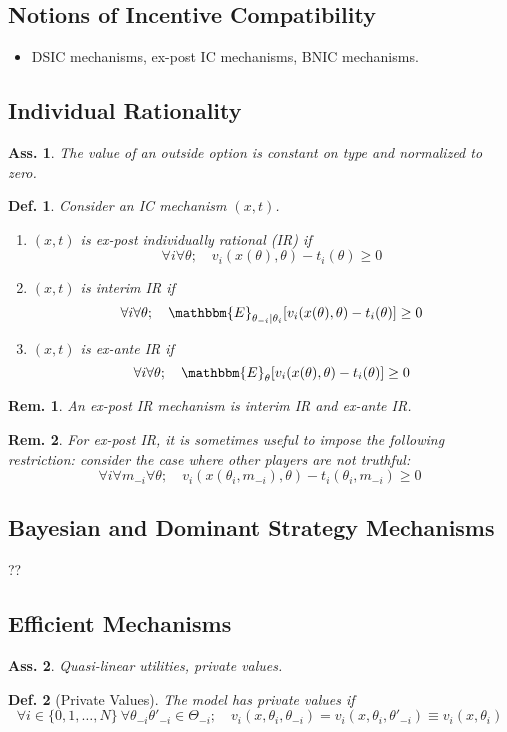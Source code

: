 \documentclass[11pt,a4paper,dvipdfmx]{article}
\theoremstyle{plain}
\newtheorem{df}{Def.}[section]
\newtheorem{rem}{Rem.}[section]
\newtheorem{ass}{Ass.}
\newcommand{\E}{\mathbbm{E}}
\newcommand{\1}{\mathbbm{1}}
\begin{document}
\subsection{Notions of Incentive Compatibility}
\begin{itemize}
	\item DSIC mechanisms, ex-post IC mechanisms, BNIC mechanisms.
\end{itemize}

\subsection{Individual Rationality}
\begin{ass}
	The value of an outside option is constant on type and normalized to zero.
\end{ass}
\begin{df} Consider an IC mechanism $(x,t)$.
	\begin{enumerate}
		\item $(x,t)$ is ex-post individually rational (IR) if
		\[
		\forall i \forall \theta; \quad
		v_i(x(\theta), \theta) - t_i(\theta) \geq 0
		\]
		\item $(x,t)$ is interim IR if
		\[
		\forall i \forall \theta; \quad
		\E_{\theta_{-i} \mid \theta_i}[v_i(x(\theta), \theta) - t_i(\theta)] \geq 0
		\]
		\item $(x,t)$ is ex-ante IR if
		\[
		\forall i \forall \theta; \quad
		\E_{\theta}[v_i(x(\theta), \theta) - t_i(\theta)] \geq 0
		\]
	\end{enumerate}
\end{df}
\begin{rem}
	An ex-post IR mechanism is interim IR and ex-ante IR.
\end{rem}
\begin{rem}
	For ex-post IR, it is sometimes useful to impose the following restriction: consider the case where other players are not truthful:
	\[
	\forall i \forall m_{-i} \forall \theta; \quad
	v_i(x(\theta_i, m_{-i}), \theta) - t_i(\theta_i, m_{-i}) \geq 0
	\]
\end{rem}

\subsection{Bayesian and Dominant Strategy Mechanisms}
??

\subsection{Efficient Mechanisms}
\begin{ass}
	Quasi-linear utilities, private values.
\end{ass}
\begin{df}[Private Values]
	The model has private values if
	\[
	\forall i \in \{0,1,\dots,N\} \ \forall \theta_{-i} \theta'_{-i} \in \Theta_{-i}; \quad
	v_i(x, \theta_i, \theta_{-i}) = v_i(x, \theta_i, \theta'_{-i}) \equiv v_i(x, \theta_i)
	\]
\end{df}
\end{document}
